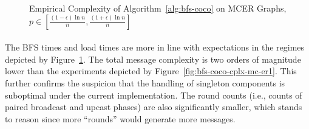 \documentclass[11pt,epsf]{article}
\begin{document}
{{{\begin{figure}
        \caption{\footnotesize Empirical Complexity of Algorithm~\ref{alg:bfs-coco} on MCER Graphs, $p \in [\frac{(1-\epsilon)\ln n}{n}, \frac{(1+\epsilon)\ln n}{n}]$}
        \label{fig:bfs-coco-cplx-mc-erL}
      \end{figure}
    }
    \paragraph{}{
      The BFS times and load times are more in line with expectations in the regimes depicted by Figure~\ref{fig:bfs-coco-cplx-mc-erL}.
      The total message complexity is two orders of magnitude lower than the experiments depicted by Figure~\ref{fig:bfs-coco-cplx-mc-er1}.
      This further confirms the suspicion that the handling of singleton components is suboptimal under the current implementation.
      The round counts (i.e., counts of paired broadcast and upcast phases) are also significantly smaller, which stands to reason
      since more ``rounds'' would generate more messages.
    }
}}
\end{document}
